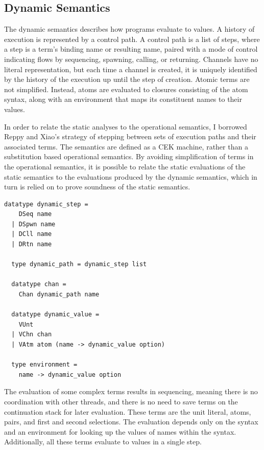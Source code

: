 \documentclass[letterpaper, 11pt]{report}
\begin{document}
\subsection{Dynamic Semantics}
The dynamic semantics describes how programs evaluate to values.
A history of execution is represented by a control path.
A control path is a list of steps, where a step is a term's 
binding name or resulting name, paired with a mode of control indicating
flows by sequencing, spawning, calling, or returning.
Channels have no literal representation, but each
time a channel is created, it is uniquely identified by the history of the execution up until
the step of creation. Atomic terms are not simplified. Instead, atoms are evaluated to
closures consisting of the atom syntax, along with an environment that maps its
constituent names to their values.

In order to relate the static analyses to the operational semantics, I
borrowed Reppy and Xiao's strategy of stepping between sets of execution paths and
their associated terms.
The semantics are defined as a CEK machine, rather than a
substitution based operational semantics. By avoiding simplification of terms in the
operational semantics, it is possible to relate
the static evaluations of the static semantics to the
evaluations produced by the dynamic semantics,
which in turn is relied on to prove soundness of the static semantics.


\begin{lstlisting}[language=logic]
  datatype dynamic_step =
    DSeq name
  | DSpwn name
  | DCll name
  | DRtn name 

  type dynamic_path = dynamic_step list

  datatype chan =
    Chan dynamic_path name 

  datatype dynamic_value = 
    VUnt
  | VChn chan
  | VAtm atom (name -> dynamic_value option)

  type environment =
    name -> dynamic_value option
\end{lstlisting}

The evaluation of some complex terms results in sequencing, meaning there is no coordination
with other threads, and there is no need to save terms on
the continuation stack for later evaluation. These terms are the
unit literal, atoms, pairs, and first and second selections. The evaluation depends only
on the syntax and an environment for looking up the values of names within the syntax.
Additionally, all these terms evaluate to values in a single step.
\end{document}
